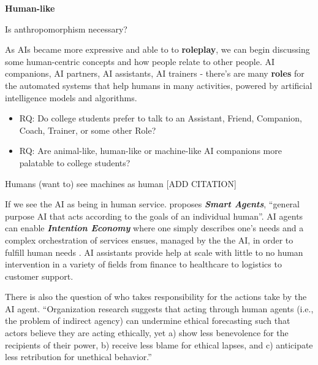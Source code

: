 \documentclass[
  letterpaper,
  DIV=11,
  numbers=noendperiod]{scrartcl}
\begin{document}
\textbf{Human-like}

Is anthropomorphism necessary?

As AIs became more expressive and able to to \textbf{roleplay}, we can
begin discussing some human-centric concepts and how people relate to
other people. AI companions, AI partners, AI assistants, AI trainers -
there's are many \textbf{roles} for the automated systems that help
humans in many activities, powered by artificial intelligence models and
algorithms.

\begin{itemize}
\item
  RQ: Do college students prefer to talk to an Assistant, Friend,
  Companion, Coach, Trainer, or some other Role?
\item
  RQ: Are animal-like, human-like or machine-like AI companions more
  palatable to college students?
\end{itemize}

Humans (want to) see machines as human {[}ADD CITATION{]}

If we see the AI as being in human service.
\citet{davidjohnstonSmartAgentProtocol2023} proposes \textbf{\emph{Smart
Agents}}, ``general purpose AI that acts according to the goals of an
individual human''. AI agents can enable \textbf{\emph{Intention
Economy}} where one simply describes one's needs and a complex
orchestration of services ensues, managed by the the AI, in order to
fulfill human needs \citet{searlsIntentionEconomyWhen2012}. AI
assistants provide help at scale with little to no human intervention in
a variety of fields from finance to healthcare to logistics to customer
support.

There is also the question of who takes responsibility for the actions
take by the AI agent. ``Organization research suggests that acting
through human agents (i.e., the problem of indirect agency) can
undermine ethical forecasting such that actors believe they are acting
ethically, yet a) show less benevolence for the recipients of their
power, b) receive less blame for ethical lapses, and c) anticipate less
retribution for unethical behavior.'' \citet{gratchPowerHarmAI2022}
\end{document}
